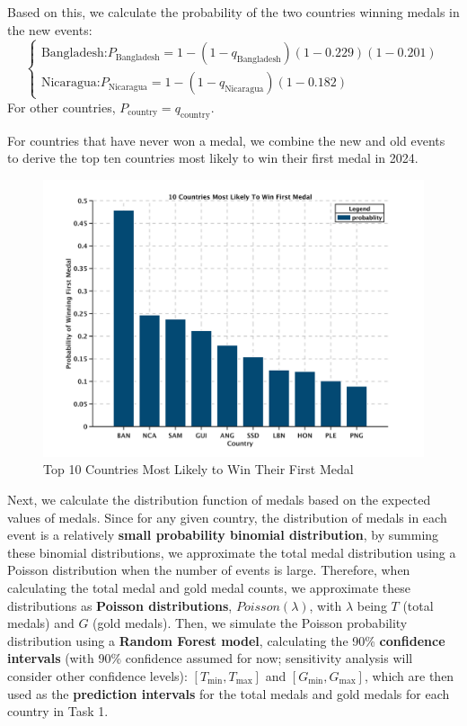 \documentclass{mcmthesis}  %
\begin{document}
Based on this, we calculate the probability of the two countries winning medals in the new events:
\[
\begin{cases}
    \text{Bangladesh:} P_{\text{Bangladesh}} = 1 - (1 - q_{\text{Bangladesh}})(1 - 0.229)(1 - 0.201)     \\
    \text{Nicaragua:} P_{\text{Nicaragua}} = 1 - (1 - q_{\text{Nicaragua}})(1 - 0.182)
\end{cases}
\]
For other countries, $P_{\text{country}} = q_{\text{country}}$.

For countries that have never won a medal, we combine the new and old events to derive the top ten countries most likely to win their first medal in 2024.

\begin{figure}
    \centering
    \includegraphics[width=0.5\linewidth]{image/10country_likely_to_win.png}
    \caption{Top 10 Countries Most Likely to Win Their First Medal}
    \label{fig:enter-label}
\end{figure}

Next, we calculate the distribution function of medals based on the expected values of medals. Since for any given country, the distribution of medals in each event is a relatively \textbf{small probability binomial distribution}, by summing these binomial distributions, we approximate the total medal distribution using a Poisson distribution when the number of events is large. Therefore, when calculating the total medal and gold medal counts, we approximate these distributions as \textbf{Poisson distributions}, $Poisson(\lambda)$, with $\lambda$ being $T$ (total medals) and $G$ (gold medals). Then, we simulate the Poisson probability distribution using a \textbf{Random Forest model}, calculating the 90\% \textbf{confidence intervals} (with 90\% confidence assumed for now; sensitivity analysis will consider other confidence levels): $[T_{\text{min}}, T_{\text{max}}]$ and $[G_{\text{min}}, G_{\text{max}}]$, which are then used as the \textbf{prediction intervals }for the total medals and gold medals for each country in Task 1.
\end{document}
